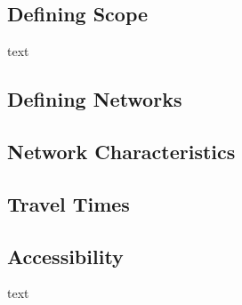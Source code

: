 \subsection{Defining Scope}

text

\subsection{Defining Networks}

\subsection{Network Characteristics}

\subsection{Travel Times}

\subsection{Accessibility}

text